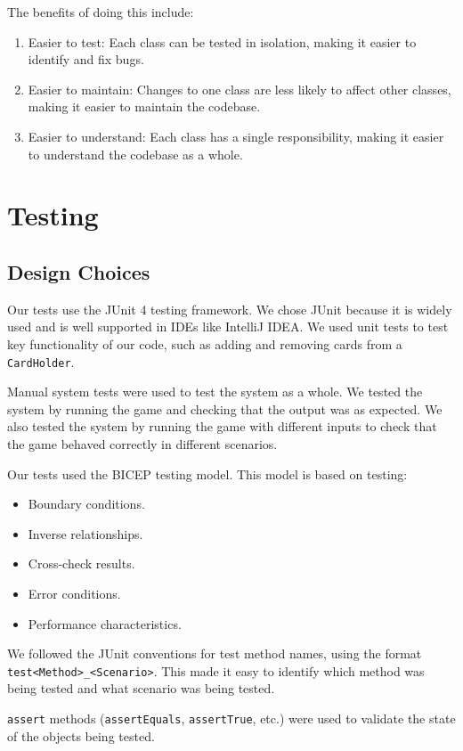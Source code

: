 \documentclass{article}
\begin{document}
The benefits of doing this include:
\begin{enumerate}
    \item Easier to test: Each class can be tested in isolation, making it easier to identify and fix bugs.
    \item Easier to maintain: Changes to one class are less likely to affect other classes, making it easier to maintain the codebase.
    \item Easier to understand: Each class has a single responsibility, making it easier to understand the codebase as a whole.
\end{enumerate}

\clearpage
\section{Testing} %

\subsection{Design Choices}
Our tests use the JUnit 4 testing framework. We chose JUnit because it is widely used and is well supported in IDEs like IntelliJ IDEA. We used unit tests to test key functionality of our code, such as adding and removing cards from a \texttt{CardHolder}.

Manual system tests were used to test the system as a whole. We tested the system by running the game and checking that the output was as expected. We also tested the system by running the game with different inputs to check that the game behaved correctly in different scenarios.

Our tests used the BICEP testing model. This model is based on testing:
\begin{itemize}
    \item Boundary conditions.
    \item Inverse relationships.
    \item Cross-check results.
    \item Error conditions.
    \item Performance characteristics.
\end{itemize}
We followed the JUnit conventions for test method names, using the format \texttt{test<Method>\_<Scenario>}. This made it easy to identify which method was being tested and what scenario was being tested.

\texttt{assert} methods (\texttt{assertEquals}, \texttt{assertTrue}, etc.) were used to validate the state of the objects being tested.
\end{document}

